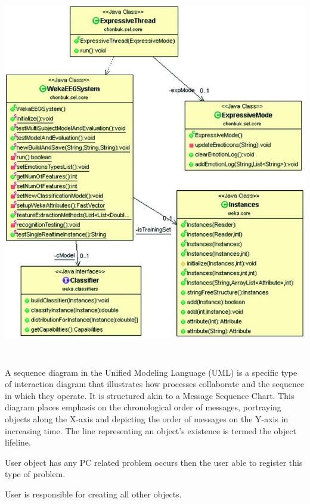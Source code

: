 \documentclass[a4paper]{article}
\begin{document}
\begin{center}
\includegraphics[width=6.4374in,height=6.4272in]{rahulop-img010.jpg}
\end{center}

\bigskip



\bigskip

A sequence diagram in the Unified Modeling Language (UML) is a specific type of interaction diagram that illustrates how
processes collaborate and the sequence in which they operate. It is structured akin to a Message Sequence Chart. This
diagram places emphasis on the chronological order of messages, portraying objects along the X-axis and depicting the
order of messages on the Y-axis in increasing time. The line representing an object's existence is termed the object
lifeline.

User object has any PC related problem occurs then the user able to register this type of problem. 

User is responsible for creating all other objects. 
\end{document}
